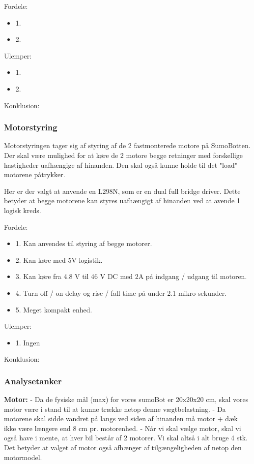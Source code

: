 Fordele:\tbr 
\begin{itemize}
\item 1.
\item 2.
\end{itemize}

Ulemper: \tbr
\begin{itemize}
\item 1.
\item 2.
\end{itemize}

Konklusion:
\tbr
\subsubsection*{\textbf{Motorstyring}}
Motorstyringen tager sig af styring af de 2 fastmonterede motore på SumoBotten. Der skal være mulighed for at køre de 2 motore begge retninger med forskellige hastigheder uafhængige af hinanden. Den skal også kunne holde til det "load" motorene påtrykker.

Her er der valgt at anvende en L298N, som er en dual full bridge driver\cite{L298Data}. Dette betyder at begge motorene kan styres uafhængigt af hinanden ved at avende 1 logisk kreds.\tbr

Fordele: 
\begin{itemize}
\item 1. Kan anvendes til styring af begge motorer.
\item 2. Kan køre med 5V logistik.
\item 3. Kan køre fra 4.8 V til 46 V DC med 2A på indgang / udgang til motoren.
\item 4. Turn off / on delay og rise / fall time på under 2.1 mikro sekunder.
\item 5.  Meget kompakt enhed. 
\end{itemize}

Ulemper: 
\begin{itemize}
\item 1. Ingen
\end{itemize}

Konklusion:


\subsubsection{Analysetanker}

\textbf{Motor:}
- Da de fysiske mål (max) for vores sumoBot er 20x20x20 cm, skal vores motor være i stand til at kunne trække netop denne vægtbelastning.
- Da motorene skal sidde vandret på langs ved siden af hinanden må motor + dæk ikke være længere end 8 cm pr. motorenhed.
- Når vi skal vælge motor, skal vi også have i mente, at hver bil består af 2 motorer. Vi skal altså i alt bruge 4 stk. Det betyder at valget af motor også afhænger af tilgængeligheden af netop den motormodel.

